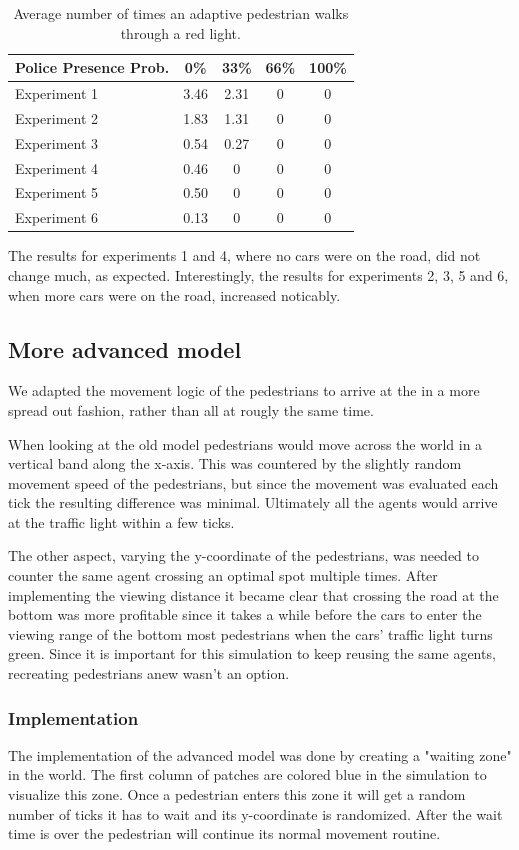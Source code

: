 \documentclass[a4paper]{article}
\begin{document}
\begin{table}[H]
\centering
\begin{tabular}{ l | c c c c }
  Police Presence Prob. & 0\% & 33\% & 66\% & 100\% \\ 
  \hline
  Experiment 1 & 3.46 & 2.31 & 0 & 0  \\
  Experiment 2 & 1.83 & 1.31 & 0 & 0  \\
  Experiment 3 & 0.54 & 0.27 & 0 & 0  \\
  Experiment 4 & 0.46 & 0    & 0 & 0  \\
  Experiment 5 & 0.50 & 0    & 0 & 0  \\
  Experiment 6 & 0.13 & 0    & 0 & 0  \\
\end{tabular}
\caption{Average number of times an adaptive 
pedestrian walks through a red light.}
\end{table}

The results for experiments 1 and 4, where no cars were on the road, did not change much, as expected. Interestingly, the results for experiments 2, 3, 5 and 6, when more cars were on the road, increased noticably. 

\subsection{More advanced model}
We adapted the movement logic of the pedestrians to arrive at the in a more spread out fashion, rather than all at rougly the same time.

When looking at the old model pedestrians would move across the world in a vertical band along the x-axis. This was countered by the slightly random movement speed of the pedestrians, but since the movement was evaluated each tick the resulting difference was minimal. Ultimately all the agents would arrive at the traffic light within a few ticks.

The other aspect, varying the y-coordinate of the pedestrians, was needed to counter the same agent crossing an optimal spot multiple times. After implementing the viewing distance it became clear that crossing the road at the bottom was more profitable since it takes a while before the cars to enter the viewing range of the bottom most pedestrians when the cars' traffic light turns green.
Since it is important for this simulation to keep reusing the same agents, recreating pedestrians anew wasn't an option.

\subsubsection{Implementation}
The implementation of the advanced model was done by creating a "waiting zone" in the world. The first column of patches are colored blue in the simulation to visualize this zone. Once a pedestrian enters this zone it will get a random number of ticks it has to wait and its y-coordinate is randomized.
After the wait time is over the pedestrian will continue its normal movement routine.
\end{document}
